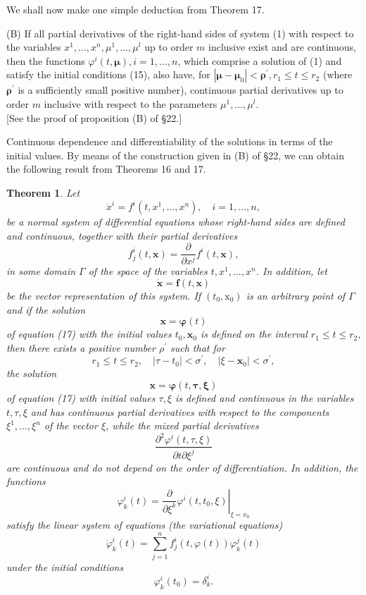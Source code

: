 \documentclass[10pt,a5paper]{book}
\theoremstyle{plain}
\newtheorem{theorem}{Theorem}
\theoremstyle{definition}
\theoremstyle{remark}
\begin{document}
We shall now make one simple deduction from Theorem 17.

(B) If all partial derivatives of the right-hand sides of system (1) with respect to the variables $x^{1}, \ldots, x^{n}, \mu^{1}, \ldots, \mu^{l}$ up to order $m$ inclusive exist and are continuous, then the functions $\varphi^{i}(t, \boldsymbol{\mu}), i=1, \ldots, n$, which comprise a solution of (1) and satisfy the initial conditions (15), also have, for $\left|\boldsymbol{\mu}-\boldsymbol{\mu}_{0}\right|<\boldsymbol{\rho}^{\prime}, r_{1} \leq t \leq r_{2}$ (where $\boldsymbol{\rho}^{\prime}$ is a sufficiently small positive number), continuous partial derivatives up to order $m$ inclusive with respect to the parameters $\mu^{1}, \ldots, \mu^{l}$.\\[0pt]
[See the proof of proposition (B) of §22.]

Continuous dependence and differentiability of the solutions in terms of the initial values. By means of the construction given in (B) of §22, we can obtain the following result from Theorems 16 and 17.

\begin{theorem}
Let
\[
\dot{x}^{i}=f^{i}\left(t, x^{1}, \ldots, x^{n}\right), \quad i=1, \ldots, n,
\]
be a normal system of differential equations whose right-hand sides are defined and continuous, together with their partial derivatives
\[
f_{j}^{i}(t, \mathbf{x})=\frac{\partial}{\partial x^{j}} f^{i}(t, \mathbf{x}),
\]
in some domain $\Gamma$ of the space of the variables $t, x^{1}, \ldots, x^{n}$. In addition, let
\begin{equation*}
\dot{\mathbf{x}}=\mathbf{f}(t, \mathbf{x}) \tag{17}
\end{equation*}
be the vector representation of this system. If $\left(t_{0}, \mathrm{x}_{0}\right)$ is an arbitrary point of $\Gamma$ and if the solution
\[
\mathbf{x}=\boldsymbol{\varphi}(t)
\]
of equation (17) with the initial values $t_{0}, \mathbf{x}_{0}$ is defined on the interval $r_{1} \leq t \leq r_{2}$, then there exists a positive number $\rho^{\prime}$ such that for
\[
r_{1} \leq t \leq r_{2}, \quad\left|\tau-t_{0}\right|<\sigma^{\prime}, \quad\left|\xi-\mathbf{x}_{0}\right|<\sigma^{\prime},
\]
the solution
\[
\mathbf{x}=\boldsymbol{\varphi}(t, \boldsymbol{\tau}, \boldsymbol{\xi})
\]
of equation (17) with initial values $\tau, \xi$ is defined and continuous in the variables $t, \tau, \xi$ and has continuous partial derivatives with respect to
the components $\xi^{1}, \ldots, \xi^{n}$ of the vector $\xi$, while the mixed partial derivatives
\[
\frac{\partial^{2} \varphi^{i}(t, \tau, \xi)}{\partial t \partial \xi^{j}}
\]
are continuous and do not depend on the order of differentiation. In addition, the functions
\[
\varphi_{k}^{i}(t)=\left.\frac{\partial}{\partial \xi^{k}} \varphi^{i}\left(t, t_{0}, \xi\right)\right|_{\xi=x_{0}}
\]
satisfy the linear system of equations (the variational equations)
\[
\dot{\varphi}_{k}^{i}(t)=\sum_{j=1}^{n} f_{j}^{i}(t, \varphi(t)) \varphi_{k}^{j}(t)
\]
under the initial conditions
\[
\varphi_{k}^{i}\left(t_{0}\right)=\delta_{k}^{i} .
\]
\end{theorem}
\end{document}

